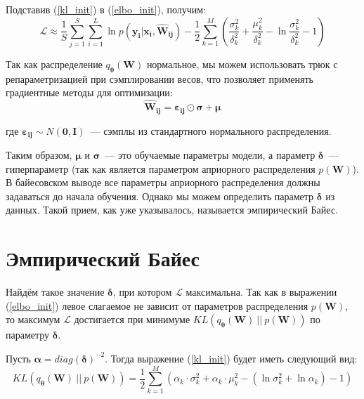 \documentclass{article}
\numberwithin{equation}{section}
\begin{document}
    Подставив (\ref{kl_init}) в (\ref{elbo_init}), получим:
    \begin{equation}\label{elbo_kl}
        \mathcal{L}
        \approx
            \frac{1}{S} \sum_{j=1}^S \sum_{i=1}^{L} {
                \ln{
                    p(\pmb{y_{i}} | \pmb{x_{i}}, \pmb{\hat{W}_{ij}})
                }
            }
        -
            \frac{1}{2}\sum_{k=1}^{M}(
            \frac
                {\sigma_{k}^2}
                {\delta_{k}^2}
            +
            \frac
                {\mu_{k}^2}
                {\delta_{k}^2}
            -
            \ln{
                \frac
                    {\sigma_{k}^2}
                    {\delta_{k}^2}
            }
            - 1
        )
    \end{equation}

    Так как распределение $q_{\pmb{\theta}}(\pmb{W})$ нормальное,
    мы можем использовать трюк с репараметризацией при сэмплировании весов,
    что позволяет применять градиентные методы для оптимизации:
    \begin{equation}\label{w_trick}
        \pmb{\hat{W}_{ij}}
        =
            \pmb{\varepsilon_{ij}}
            \odot
            \pmb{\sigma}
            +
            \pmb{\mu}
    \end{equation}

    где $\pmb{\varepsilon_{ij}} \sim N(\pmb{0}, \pmb{I})$~--- сэмплы из стандартного
    нормального распределения.

    Таким образом,
    $\pmb{\mu}$ и $\pmb{\sigma}$~--- это обучаемые параметры модели,
    а параметр $\pmb{\delta}$~--- гиперпараметр
    (так как является параметром априорного распределения $p(\pmb{W})$).
    В байесовском выводе все параметры априорного распределения
    должны задаваться до начала обучения.
    Однако мы можем определить параметр $\pmb{\delta}$ из данных.
    Такой прием, как уже указывалось, называется эмпирический Байес.

    \section{Эмпирический Байес}
    Найдём такое значение $\pmb{\delta}$, при котором $\mathcal{L}$ максимальна.
    Так как в выражении (\ref{elbo_init})
    левое слагаемое не зависит от параметров распределения
    $p(\pmb{W})$, то максимум $\mathcal{L}$ достигается при минимуме
    $KL(q_{\pmb{\theta}}(\pmb{W})~||~p(\pmb{W}))$ по параметру $\pmb{\delta}$.

    Пусть $\pmb{\alpha} = diag(\pmb{\delta})^{-2}$.
    Тогда выражение (\ref{kl_init}) будет иметь следующий вид:
    \begin{equation}\label{kl_init_alpha}
        KL(
            q_{\pmb{\theta}}(\pmb{W})~||~p(\pmb{W})
        )
        =
            \frac{1}{2} \sum_{k=1}^{M} \left(
                \alpha_{k} \cdot \sigma_{k}^2
                + \alpha_{k} \cdot \mu_{k}^2
                - (\ln{\sigma_{k}^2} + \ln{\alpha_{k}})
                - 1
            \right)
    \end{equation}
\end{document}
